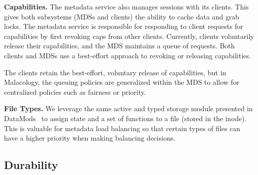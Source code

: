 \documentclass[10pt,twocolumn]{article}
\begin{document}
{\bf Capabilities.} The metadata service also manages sessions with its
clients. This gives both subsystems (MDSs and clients) the ability to cache
data and grab locks. The metadata service is responsible for responding to
client requests for capabilities by first revoking caps from other clients.
Currently, clients voluntarily release their capabilities, and the MDS maintains
a queue of requests.  Both clients and MDSs use a best-effort approach to
revoking or releasing capabilities.

The clients retain the best-effort, voluntary release of capabilities, but in
Malacology, the queuing policies are generalized within the MDS to allow for
centralized policies such as fairness or priority.

{\bf File Types.} We leverage the same active and typed storage module
presented in DataMods~\cite{watkins_datamods_2012} to assign state and a set of
functions to a file (stored in the inode). This is valuable for
metadata load balancing so that certain types of files can have a higher
priority when making balancing decisions.




\subsection{Durability}
\label{sec:durability}
\end{document}
